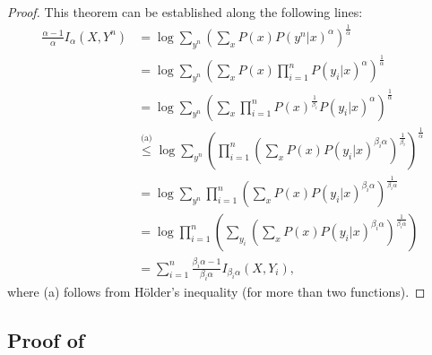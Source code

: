 \documentclass{article}
\numberwithin{theorem}{section}
\numberwithin{example}{section}
\numberwithin{remark}{section}
\numberwithin{definition}{section}
\begin{document}
\begin{proof}
This theorem can be established along the following lines:
    \begin{align}
      \frac{\alpha-1}{\alpha}  I_\alpha (X, Y^n) & =  \log  \sum_{y^n} \left( \sum_x P(x) P(y^n|x)^{\alpha} \right)^{ \frac{1}{\alpha}}  \\
      & = \log  \sum_{y^n} \left( \sum_x P(x) \prod_{i=1}^n P(y_i|x)^{\alpha} \right)^{ \frac{1}{\alpha}}  \\
      & = \log  \sum_{y^n} \left( \sum_x  \prod_{i=1}^n P(x)^{\frac{1}{\beta_i}} P(y_i|x)^\alpha \right)^{ \frac{1}{\alpha}}  \\
      & \stackrel{\text{(a)}} \leq \log  \sum_{y^n} \left(  \prod_{i=1}^n   \left( \sum_x  P(x) P(y_i|x)^{\beta_i \alpha} \right)^{\frac{1}{\beta_i}} \right)^{ \frac{1}{\alpha}}  \\
      & = \log  \sum_{y^n}   \prod_{i=1}^n   \left( \sum_x  P(x) P(y_i|x)^{\beta_i \alpha} \right)^{\frac{1}{\beta_i\alpha }}  \\
      & = \log \prod_{i=1}^n \left( \sum_{y_i} \left( \sum_x  P(x) P(y_i|x)^{\beta_i \alpha} \right)^{\frac{1}{\beta_i\alpha }} \right) \\
      & = \sum_{i=1}^n \frac{\beta_i \alpha-1}{\beta_i \alpha} I_{\beta_i \alpha}(X,Y_i),
    \end{align}
    where (a) follows from H\"older's inequality (for more than two functions).%
\end{proof}
\subsection{Proof of~} \label{app:sibson-capacity-proof}
\end{document}
